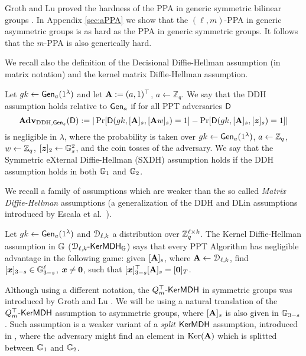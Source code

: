 Groth and Lu proved the hardness of the PPA in generic symmetric bilinear groups \cite{AC:GroLu07}. In Appendix \ref{sec:aPPA} we show that the $(\ell,m)$-PPA in generic asymmetric groups is as hard as the PPA in generic symmetric groups. It follows that the $m$-PPA is also generically hard.

We recall also the definition of the Decisional Diffie-Hellman assumption (in matrix notation) and the kernel matrix Diffie-Hellman assumption.

\begin{definition}\label{def:dlin}
 Let  ${gk} 
\gets \mathsf{Gen}_a(1^\lambda)$ and let $\mathbf{{A}} := (a,1)^\top$, $a\gets\mathbb{Z}_q$.
We say that the DDH assumption holds relative to $\mathsf{Gen}_a$ if for all PPT adversaries $\mathsf{D}$
$$
\mathbf{Adv}_{\mathrm{DDH},\mathsf{Gen}_s}(\mathsf{D}) := |
	\Pr[
		\mathsf{D}(
			gk,
			[\mathbf{{A}}]_s,
			[\mathbf{{A}}{w}]_s)=1]
	-\Pr[
		\mathsf{D}(
		gk,
		[\mathbf{{A}}]_s,
		[{\boldsymbol{z}}]_s)=1]|
$$
is negligible in $\lambda$, where the probability is taken over $gk\gets\mathsf{Gen}_a(1^\lambda)$, $a\gets\mathbb{Z}_q$, ${w}\gets\mathbb{Z}_q$, $[{\boldsymbol{z}}]_2\gets\mathbb{G}^2_s$, and the coin tosses of the adversary.
We say that the Symmetric eXternal Diffie-Hellman (SXDH) assumption holds if the DDH assumption holds in both $\mathbb{G}_1$ and $\mathbb{G}_2$.
\end{definition}

We recall a family of assumptions which are weaker than the so called \emph{Matrix Diffie-Hellman} assumptions (a generalization of the DDH and DLin assumptions introduced by Escala et al.~\cite{C:EHKRV13}).
\begin{definition} Let  ${gk} 
\gets\mathsf{Gen}_a(1^\lambda)$ and $\mathcal{D}_{\ell,k}$ a distribution over $\mathbb{Z}_q^{\ell\times k}$.
The Kernel Diffie-Hellman assumption in $\mathbb{G}$ ($\mathcal{D}_{\ell,k}\mbox{-}\mathsf{KerMDH}_{\mathbb{G}}$) says that every PPT Algorithm has negligible advantage in the following  game: given $[\mathbf{{A}}]_s$, where $\mathbf{{A}} \gets \mathcal{D}_{\ell,k}$, find $[{\boldsymbol{x}}]_{3-s} \in \mathbb{G}^{\ell}_{3-s}$, ${\boldsymbol{x}} \neq {\boldsymbol{0}}$, such that 
$[{\boldsymbol{x}}]_{3-s}^{\top}[\mathbf{{A}}]_s=[{\boldsymbol{0}}]_T$. 
\end{definition}
Although using a different notation, the $Q_m^\top\mbox{-}\mathsf{KerMDH}$ in symmetric groups was introduced by Groth and Lu \cite{AC:GroLu07}.
We will be using a natural translation of the $Q_m^\top\mbox{-}\mathsf{KerMDH}$ assumption to asymmetric groups, where  $[\mathbf{{A}}]_s$ is also given in $\mathbb{G}_{3-s}$.  Such assumption is a weaker variant of a \emph{split} $\mathsf{KerMDH}$ assumption, introduced in \cite{AC:GonHevRaf15}, where the adversary might find an element in $\mathrm{Ker}(\mathbf{{A}})$ which is splitted between $\mathbb{G}_1$ and $\mathbb{G}_2$.

